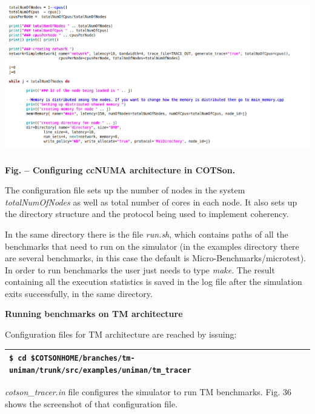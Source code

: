 \documentclass[a4paper]{article}
\newcounter{Figure}
\renewcommand\theFigure{\arabic{Figure}}
\begin{document}
{\centering 
\includegraphics[width=5.6091in,height=2.6244in]{img51.png}
\par}

{\centering{}\sffamily\bfseries
\label{bkm:Ref388170890}Fig.
\stepcounter{Figure}{\theFigure} -- Configuring ccNUMA architecture in
COTSon.
\par}

{
The configuration file sets up the number of nodes in the system
\textit{totalNumOfNodes} as well as total number of cores in each node.
It also sets up the directory structure and the protocol being used to
implement coherency.}

{
In the same directory there is the file \textit{run.sh}, which contains
paths of all the benchmarks that need to run on the simulator (in the
examples directory there are several benchmarks, in this case the
default is Micro-Benchmarks/microtest). In order to run benchmarks the
user just needs to type \textit{make}. The result containing all the
execution statistics is saved in the log file after the simulation
exits successfully, in the same directory.}

{
\textbf{Running benchmarks on TM architecture}}

{
Configuration files for TM architecture are reached by issuing:}

\begin{flushleft}
\tablehead{}
\begin{supertabular}{|m{6.29346in}|}
\hline
{} \texttt{\$ cd
\$COTSONHOME/branches/tm-uniman/trunk/src/examples/uniman/tm\_tracer}\\\hline
\end{supertabular}
\end{flushleft}
{
\textit{cotson\_tracer}.\textit{in} file configures the simulator to run
TM benchmarks. Fig. 36 shows the screenshot of that configuration
file.}
\end{document}
